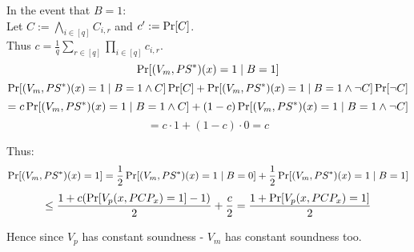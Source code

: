 \begin{itemize}
		In the event that $B=1$:\\
		Let $C:=\bigwedge_{i\in[q]}C_{i,r}$ and $c':=\operatorname*{Pr}[C]$.\\
		Thus $c=\frac{1}{q}\sum_{r\in[q]}\prod_{i\in[q]}c_{i,r}$.\\
		\[
			\operatorname*{Pr}[(V_m,PS^*)(x)=1\mid B=1]
		\]
		\[
			\operatorname*{Pr}[(V_m,PS^*)(x)=1\mid B=1\wedge C]\operatorname*{Pr}[C]
			+\operatorname*{Pr}[(V_m,PS^*)(x)=1\mid B=1\wedge \neg C]\operatorname*{Pr}[\neg C]
		\]
		\[
			=c\operatorname*{Pr}[(V_m,PS^*)(x)=1\mid B=1\wedge C]
			+(1-c)\operatorname*{Pr}[(V_m,PS^*)(x)=1\mid B=1\wedge \neg C]
		\]
		\[
			=c\cdot 1+(1-c)\cdot 0=c
		\]

		Thus:
		\[
			\operatorname*{Pr}[(V_m,PS^*)(x)=1]
			=\frac{1}{2}\operatorname*{Pr}[(V_m,PS^*)(x)=1\mid B=0]+\frac{1}{2}\operatorname*{Pr}[(V_m,PS^*)(x)=1\mid B=1]
		\]
		\[
			\leq \frac{1+c(\operatorname*{Pr}[V_p(x, PCP_x)=1]-1)}{2}+\frac{c}{2}=\frac{1+\operatorname*{Pr}[V_p(x, PCP_x)=1]}{2}
		\]

		Hence since $V_p$ has constant soundness - $V_m$ has constant soundness too.
\end{itemize}